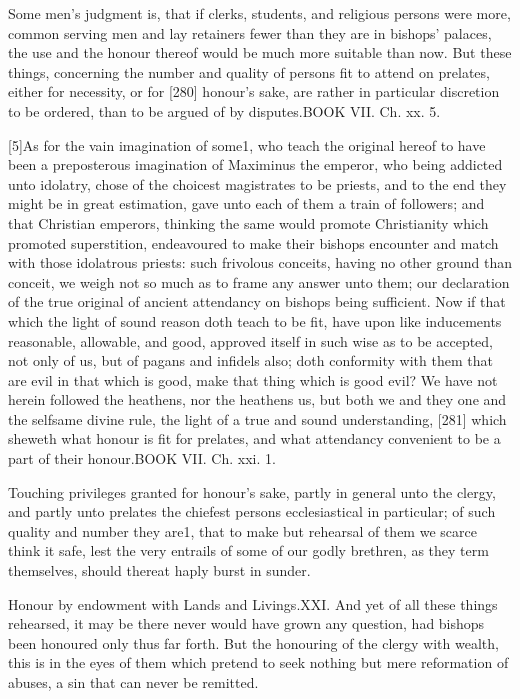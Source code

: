 Some men’s judgment is, that if clerks, students, and religious persons were more, common serving men and lay retainers fewer than they are in bishops’ palaces, the use and the honour thereof would be much more suitable than now. But these things, concerning the number and quality of persons fit to attend on prelates, either for necessity, or for [280] honour’s sake, are rather in particular discretion to be ordered, than to be argued of by disputes.BOOK VII. Ch. xx. 5.

[5]As for the vain imagination of some1, who teach the original hereof to have been a preposterous imagination of Maximinus the emperor, who being addicted unto idolatry, chose of the choicest magistrates to be priests, and to the end they might be in great estimation, gave unto each of them a train of followers; and that Christian emperors, thinking the same would promote Christianity which promoted superstition, endeavoured to make their bishops encounter and match with those idolatrous priests: such frivolous conceits, having no other ground than conceit, we weigh not so much as to frame any answer unto them; our declaration of the true original of ancient attendancy on bishops being sufficient. Now if that which the light of sound reason doth teach to be fit, have upon like inducements reasonable, allowable, and good, approved itself in such wise as to be accepted, not only of us, but of pagans and infidels also; doth conformity with them that are evil in that which is good, make that thing which is good evil? We have not herein followed the heathens, nor the heathens us, but both we and they one and the selfsame divine rule, the light of a true and sound understanding, [281] which sheweth what honour is fit for prelates, and what attendancy convenient to be a part of their honour.BOOK VII. Ch. xxi. 1.

Touching privileges granted for honour’s sake, partly in general unto the clergy, and partly unto prelates the chiefest persons ecclesiastical in particular; of such quality and number they are1, that to make but rehearsal of them we scarce think it safe, lest the very entrails of some of our godly brethren, as they term themselves, should thereat haply burst in sunder.

Honour by endowment with Lands and Livings.XXI. And yet of all these things rehearsed, it may be there never would have grown any question, had bishops been honoured only thus far forth. But the honouring of the clergy with wealth, this is in the eyes of them which pretend to seek nothing but mere reformation of abuses, a sin that can never be remitted.

